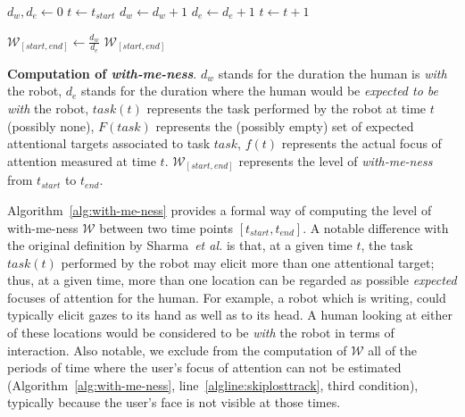 \documentclass{sig-alternate}
\newcommand{\etal}{\textit{et al.}\xspace}
\begin{document}
\begin{algorithm}[h!]
    \centering

    \begin{algorithmic}[1]
     {}
    \State $d_w, d_e \gets 0$
    \State $t \gets t_{start}$
    \Repeat
     \label{algline:skiplosttrack}
            \State $d_w \gets d_w + 1$
        \EndIf
        \State $d_e \gets d_e + 1$
    \EndIf
    \State $t \gets t + 1$

    \State $\mathcal{W}_{[start, end]} \gets \frac{d_w}{d_e}$
    \State \Return $\mathcal{W}_{[start, end]}$
    \EndProcedure

    \end{algorithmic}

    \caption{\textbf{Computation of \emph{with-me-ness}}. $d_w$ stands for the duration
        the human is \emph{with} the robot, $d_e$ stands for the duration where
        the human would be \emph{expected to be with} the robot, $task(t)$
        represents the task performed by the robot at time $t$ (possibly none),
        $F(task)$ represents the (possibly empty) set of expected attentional
        targets associated to task $task$, $f(t)$ represents the actual focus of
        attention measured at time $t$. $\mathcal{W}_{[start, end]}$ represents
        the level of \emph{with-me-ness} from $t_{start}$ to $t_{end}$.}
    \label{alg:with-me-ness}
\end{algorithm}

Algorithm~\ref{alg:with-me-ness} provides a formal way of computing the level of
with-me-ness $\mathcal{W}$ between two time points $[t_{start}, t_{end}]$. A
notable difference with the original definition by Sharma~\etal is that, at a
given time $t$, the task $task(t)$ performed by the robot may elicit more than
one attentional target; thus, at a given time, more than one location can be
regarded as possible \emph{expected} focuses of attention for the human. For
example, a robot which is writing, could typically elicit gazes to its hand as
well as to its head. A human looking at either of these locations would be
considered to be \emph{with} the robot in terms of interaction. Also notable, we
exclude from the computation of $\mathcal{W}$ all of the periods of time where
the user's focus of attention can not be estimated (Algorithm~\ref{alg:with-me-ness},
line~\ref{algline:skiplosttrack}, third condition), typically because the user's
face is not visible at those times.
\end{document}
